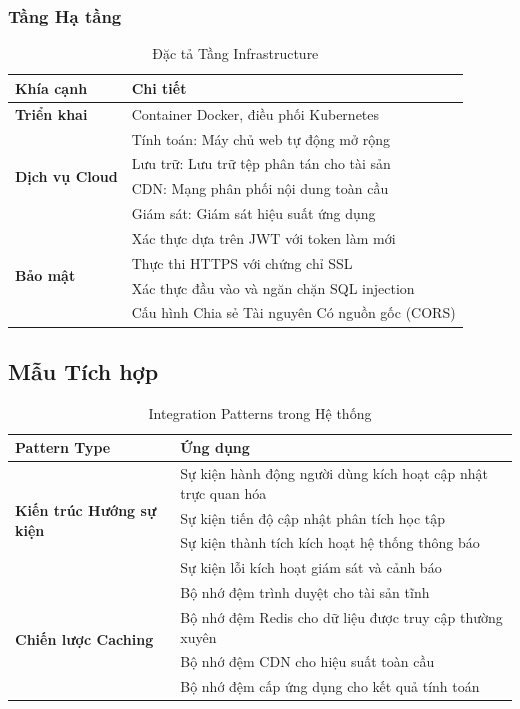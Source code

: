 \subsubsection{Tầng Hạ tầng}

\begin{table}[H]
\centering
\caption{Đặc tả Tầng Infrastructure}
\label{tab:infrastructure-specs}
\begin{tabular}{|p{3cm}|p{10cm}|}
\hline
\textbf{Khía cạnh} & \textbf{Chi tiết} \\
\hline
\textbf{Triển khai} & Container Docker, điều phối Kubernetes \\
\hline
\multirow{4}{3cm}{\textbf{Dịch vụ Cloud}} 
& Tính toán: Máy chủ web tự động mở rộng \\
\cline{2-2}
& Lưu trữ: Lưu trữ tệp phân tán cho tài sản \\
\cline{2-2}
& CDN: Mạng phân phối nội dung toàn cầu \\
\cline{2-2}
& Giám sát: Giám sát hiệu suất ứng dụng \\
\hline
\multirow{4}{3cm}{\textbf{Bảo mật}} 
& Xác thực dựa trên JWT với token làm mới \\
\cline{2-2}
& Thực thi HTTPS với chứng chỉ SSL \\
\cline{2-2}
& Xác thực đầu vào và ngăn chặn SQL injection \\
\cline{2-2}
& Cấu hình Chia sẻ Tài nguyên Có nguồn gốc (CORS) \\
\hline
\end{tabular}
\end{table}

\subsection{Mẫu Tích hợp}

\begin{table}[H]
\centering
\caption{Integration Patterns trong Hệ thống}
\label{tab:integration-patterns}
\begin{tabular}{|p{4cm}|p{9cm}|}
\hline
\textbf{Pattern Type} & \textbf{Ứng dụng} \\
\hline
\multirow{4}{4cm}{\textbf{Kiến trúc Hướng sự kiện}} 
& Sự kiện hành động người dùng kích hoạt cập nhật trực quan hóa \\
\cline{2-2}
& Sự kiện tiến độ cập nhật phân tích học tập \\
\cline{2-2}
& Sự kiện thành tích kích hoạt hệ thống thông báo \\
\cline{2-2}
& Sự kiện lỗi kích hoạt giám sát và cảnh báo \\
\hline
\multirow{4}{4cm}{\textbf{Chiến lược Caching}} 
& Bộ nhớ đệm trình duyệt cho tài sản tĩnh \\
\cline{2-2}
& Bộ nhớ đệm Redis cho dữ liệu được truy cập thường xuyên \\
\cline{2-2}
& Bộ nhớ đệm CDN cho hiệu suất toàn cầu \\
\cline{2-2}
& Bộ nhớ đệm cấp ứng dụng cho kết quả tính toán \\
\hline
\end{tabular}
\end{table}

